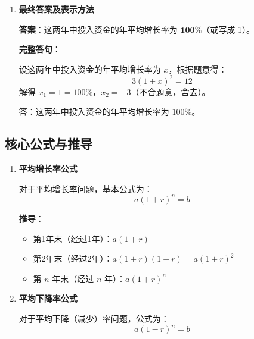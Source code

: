 \documentclass[UTF8]{ctexart}
\newenvironment{redenv}{\color{red}}{}
\newenvironment{detailedanalysis}{%
    \color{red}
    \begin{enumerate}[label=\textbf{第\arabic*步：}, leftmargin=*, align=left, itemsep=1.5ex]
}{%
    \end{enumerate}
}
\newenvironment{formuladerivation}{%
    \begin{enumerate}[label={\textbf{公式\arabic*：}}, leftmargin=*, align=left]
}{%
    \end{enumerate}
}
\begin{document}
\begin{redenv}
\begin{detailedanalysis}
\noindent\textbf{验证计算}：
\begin{itemize}
    \item 去年投入：3 亿元
    \item 今年投入：$3 \times (1+100\%) = 3 \times 2 = 6$ 亿元
    \item 明年投入：$6 \times (1+100\%) = 6 \times 2 = 12$ 亿元 \checkmark
\end{itemize}

\noindent\textbf{逻辑检验}：
\begin{itemize}
    \item 增长率为正数，符合"逐年增加"的描述
    \item 两年正好从 3 亿增长到 12 亿（$3 \to 6 \to 12$），验证正确
\end{itemize}

\item \textbf{最终答案及表示方法}

\textbf{答案}：这两年中投入资金的年平均增长率为 \textbf{$\mathbf{100\%}$}（或写成 1）。

\textbf{完整答句}：

设这两年中投入资金的年平均增长率为 $x$，根据题意得：
\[
3(1+x)^2 = 12
\]
解得 $x_1 = 1 = 100\%$，$x_2 = -3$（不合题意，舍去）。

答：这两年中投入资金的年平均增长率为 $100\%$。
\end{detailedanalysis}

\subsection*{核心公式与推导}

\begin{formuladerivation}
\item \textbf{平均增长率公式}

对于平均增长率问题，基本公式为：
\[
a(1+r)^n = b
\]

\textbf{推导}：
\begin{itemize}
    \item 第1年末（经过1年）：$a(1+r)$
    \item 第2年末（经过2年）：$a(1+r)(1+r) = a(1+r)^2$
    \item 第 $n$ 年末（经过 $n$ 年）：$a(1+r)^n$
\end{itemize}

\item \textbf{平均下降率公式}

对于平均下降（减少）率问题，公式为：
\[
a(1-r)^n = b
\]


\end{formuladerivation}
\end{redenv}
\end{document}
